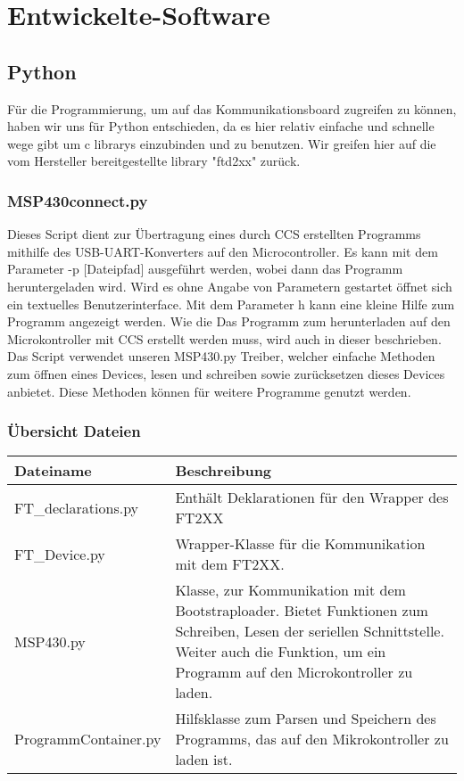 %
\chapter{Entwickelte-Software}
\label{chap:Anwendung}

\section{Python}
Für die Programmierung, um auf das Kommunikationsboard zugreifen zu können, haben wir uns für Python entschieden, da es hier relativ einfache und schnelle wege gibt um c librarys einzubinden und zu benutzen.  Wir greifen hier auf die vom Hersteller bereitgestellte library "ftd2xx" zurück.

\subsection{MSP430connect.py}
Dieses Script dient zur Übertragung eines durch CCS erstellten Programms mithilfe des USB-UART-Konverters auf den Microcontroller. Es kann mit dem Parameter -p [Dateipfad] ausgeführt werden, wobei dann das Programm heruntergeladen wird. Wird es ohne Angabe von Parametern gestartet öffnet sich ein textuelles Benutzerinterface. Mit dem Parameter h kann eine kleine Hilfe zum Programm angezeigt werden. Wie die Das Programm zum herunterladen auf den Microkontroller mit CCS erstellt werden muss, wird auch in dieser beschrieben.
Das Script verwendet unseren MSP430.py Treiber, welcher einfache Methoden zum öffnen eines Devices, lesen und schreiben sowie zurücksetzen dieses Devices anbietet. Diese Methoden können für weitere Programme genutzt werden.


\subsection{Übersicht Dateien}

\begin{tabular}{|l|p{11cm}| }
\hline
Dateiname & Beschreibung \\ \hline
FT\_declarations.py & Enthält Deklarationen für den Wrapper des FT2XX \\ \hline
FT\_Device.py & Wrapper-Klasse für die Kommunikation mit dem FT2XX. \\ \hline
MSP430.py	& Klasse, zur Kommunikation mit dem Bootstraploader. Bietet Funktionen zum Schreiben, Lesen der seriellen Schnittstelle. Weiter auch die Funktion, um ein Programm auf den Microkontroller zu laden. \\ \hline
ProgrammContainer.py  & Hilfsklasse zum Parsen und Speichern des Programms, das auf den Mikrokontroller zu laden ist. \\ \hline
\end{tabular} 


